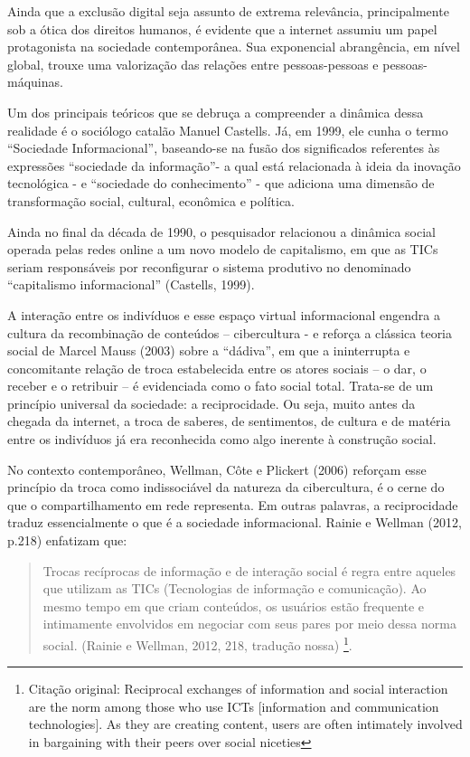 Ainda que a exclusão digital seja assunto de extrema relevância,
principalmente sob a ótica dos direitos humanos, é evidente que a
internet assumiu um papel protagonista na sociedade contemporânea. Sua
exponencial abrangência, em nível global, trouxe uma valorização das
relações entre pessoas-pessoas e pessoas-máquinas.

Um dos principais teóricos que se debruça a compreender a dinâmica dessa
realidade é o sociólogo catalão Manuel Castells. Já, em 1999, ele cunha
o termo ``Sociedade Informacional'', baseando-se na fusão dos
significados referentes às expressões ``sociedade da informação''- a
qual está relacionada à ideia da inovação tecnológica - e ``sociedade do
conhecimento'' - que adiciona uma dimensão de transformação social,
cultural, econômica e política.

Ainda no final da década de 1990, o pesquisador relacionou a dinâmica
social operada pelas redes online a um novo modelo de capitalismo, em
que as TICs seriam responsáveis por reconfigurar o sistema produtivo no
denominado ``capitalismo informacional'' (Castells, 1999).

A interação entre os indivíduos e esse espaço virtual informacional
engendra a cultura da recombinação de conteúdos -- cibercultura - e
reforça a clássica teoria social de Marcel Mauss (2003) sobre a
``dádiva'', em que a ininterrupta e concomitante relação de troca
estabelecida entre os atores sociais -- o dar, o receber e o retribuir
-- é evidenciada como o fato social total. Trata-se de um princípio
universal da sociedade: a reciprocidade. Ou seja, muito antes da chegada
da internet, a troca de saberes, de sentimentos, de cultura e de matéria
entre os indivíduos já era reconhecida como algo inerente à construção
social.

No contexto contemporâneo, Wellman, Côte e Plickert (2006) reforçam esse
princípio da troca como indissociável da natureza da cibercultura, é o
cerne do que o compartilhamento em rede representa. Em outras palavras,
a reciprocidade traduz essencialmente o que é a sociedade informacional.
Rainie e Wellman (2012, p.218) enfatizam que:

\begin{quote}
Trocas recíprocas de informação e de interação social é regra entre
aqueles que utilizam as TICs (Tecnologias de informação e comunicação).
Ao mesmo tempo em que criam conteúdos, os usuários estão frequente e
intimamente envolvidos em negociar com seus pares por meio dessa norma
social. (Rainie e Wellman, 2012, 218, tradução nossa) \footnote{Citação
  original: Reciprocal exchanges of information and social interaction
  are the norm among those who use ICTs {[}information and communication
  technologies{]}. As they are creating content, users are often
  intimately involved in bargaining with their peers over social
  niceties}.
\end{quote}

